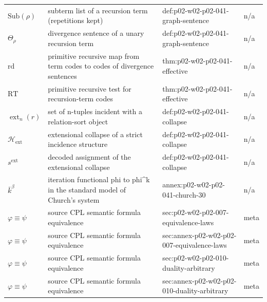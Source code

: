 \begin{longtable}{@{}p{}p{}p{}p{}@{}}
\(\mathrm{Sub}(\rho)\) & subterm list of a recursion term (repetitions kept) & def:\allowbreak{}p02-\allowbreak{}w02-\allowbreak{}p02-\allowbreak{}041-\allowbreak{}graph-\allowbreak{}sentence & n/a \\
\(\Theta_\rho\) & divergence sentence of a unary recursion term & def:\allowbreak{}p02-\allowbreak{}w02-\allowbreak{}p02-\allowbreak{}041-\allowbreak{}graph-\allowbreak{}sentence & n/a \\
\(\mathrm{rd}\) & primitive recursive map from term codes to codes of divergence sentences & thm:\allowbreak{}p02-\allowbreak{}w02-\allowbreak{}p02-\allowbreak{}041-\allowbreak{}effective & n/a \\
\(\mathrm{RT}\) & primitive recursive test for recursion-term codes & thm:\allowbreak{}p02-\allowbreak{}w02-\allowbreak{}p02-\allowbreak{}041-\allowbreak{}effective & n/a \\
\(\operatorname{ext}_n(r)\) & set of n-tuples incident with a relation-sort object & def:\allowbreak{}p02-\allowbreak{}w02-\allowbreak{}p02-\allowbreak{}041-\allowbreak{}collapse & n/a \\
\(\mathcal H_{\mathrm{ext}}\) & extensional collapse of a strict incidence structure & def:\allowbreak{}p02-\allowbreak{}w02-\allowbreak{}p02-\allowbreak{}041-\allowbreak{}collapse & n/a \\
\(s^{\mathrm{ext}}\) & decoded assignment of the extensional collapse & def:\allowbreak{}p02-\allowbreak{}w02-\allowbreak{}p02-\allowbreak{}041-\allowbreak{}collapse & n/a \\
\(\bar k^{\beta}\) & iteration functional phi to phi\^{}k in the standard model of Church's system & annex:\allowbreak{}p02-\allowbreak{}w02-\allowbreak{}p02-\allowbreak{}041-\allowbreak{}church-\allowbreak{}30 & n/a \\
\(\varphi\equiv\psi\) & source CPL semantic formula equivalence & sec:\allowbreak{}p02-\allowbreak{}w02-\allowbreak{}p02-\allowbreak{}007-\allowbreak{}equivalence-\allowbreak{}laws & meta \\
\(\varphi\equiv\psi\) & source CPL semantic formula equivalence & sec:\allowbreak{}annex-\allowbreak{}p02-\allowbreak{}w02-\allowbreak{}p02-\allowbreak{}007-\allowbreak{}equivalence-\allowbreak{}laws & meta \\
\(\varphi\equiv\psi\) & source CPL semantic formula equivalence & sec:\allowbreak{}p02-\allowbreak{}w02-\allowbreak{}p02-\allowbreak{}010-\allowbreak{}duality-\allowbreak{}arbitrary & meta \\
\(\varphi\equiv\psi\) & source CPL semantic formula equivalence & sec:\allowbreak{}annex-\allowbreak{}p02-\allowbreak{}w02-\allowbreak{}p02-\allowbreak{}010-\allowbreak{}duality-\allowbreak{}arbitrary & meta \\

\end{longtable}
